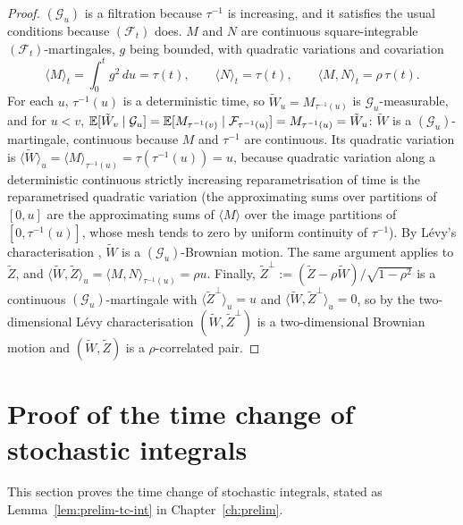 \documentclass[../../main.tex]{subfiles}
\begin{document}
\begin{proof}
$(\mathcal G_u)$ is a filtration because $\tau^{-1}$ is increasing, and it satisfies the usual conditions because $(\mathcal F_t)$ does. $M$ and $N$ are continuous square-integrable $(\mathcal F_t)$-martingales, $g$ being bounded, with quadratic variations and covariation
\[
\langle M\rangle_t=\int_0^tg^2\,du=\tau(t),\qquad\langle N\rangle_t=\tau(t),\qquad\langle M,N\rangle_t=\rho\,\tau(t).
\]
For each $u$, $\tau^{-1}(u)$ is a deterministic time, so $\tilde W_u=M_{\tau^{-1}(u)}$ is $\mathcal G_u$-measurable, and for $u<v$, $\mathbb{E}[\tilde W_v\mid\mathcal G_u]=\mathbb{E}[M_{\tau^{-1}(v)}\mid\mathcal F_{\tau^{-1}(u)}]=M_{\tau^{-1}(u)}=\tilde W_u$: $\tilde W$ is a $(\mathcal G_u)$-martingale, continuous because $M$ and $\tau^{-1}$ are continuous. Its quadratic variation is $\langle\tilde W\rangle_u=\langle M\rangle_{\tau^{-1}(u)}=\tau(\tau^{-1}(u))=u$, because quadratic variation along a deterministic continuous strictly increasing reparametrisation of time is the reparametrised quadratic variation (the approximating sums over partitions of $[0,u]$ are the approximating sums of $\langle M\rangle$ over the image partitions of $[0,\tau^{-1}(u)]$, whose mesh tends to zero by uniform continuity of $\tau^{-1}$). By L\'evy's characterisation \cite[Thm.~3.3.16]{karatzas1991}, $\tilde W$ is a $(\mathcal G_u)$-Brownian motion. The same argument applies to $\tilde Z$, and $\langle\tilde W,\tilde Z\rangle_u=\langle M,N\rangle_{\tau^{-1}(u)}=\rho u$. Finally, $\tilde Z^\perp:=(\tilde Z-\rho\tilde W)/\sqrt{1-\rho^2}$ is a continuous $(\mathcal G_u)$-martingale with $\langle\tilde Z^\perp\rangle_u=u$ and $\langle\tilde W,\tilde Z^\perp\rangle_u=0$, so by the two-dimensional L\'evy characterisation $(\tilde W,\tilde Z^\perp)$ is a two-dimensional Brownian motion and $(\tilde W,\tilde Z)$ is a $\rho$-correlated pair.
\end{proof}

\section{Proof of the time change of stochastic integrals}\label{appB:tcint}

This section proves the time change of stochastic integrals, stated as Lemma~\ref{lem:prelim-tc-int} in Chapter~\ref{ch:prelim}.
\end{document}
